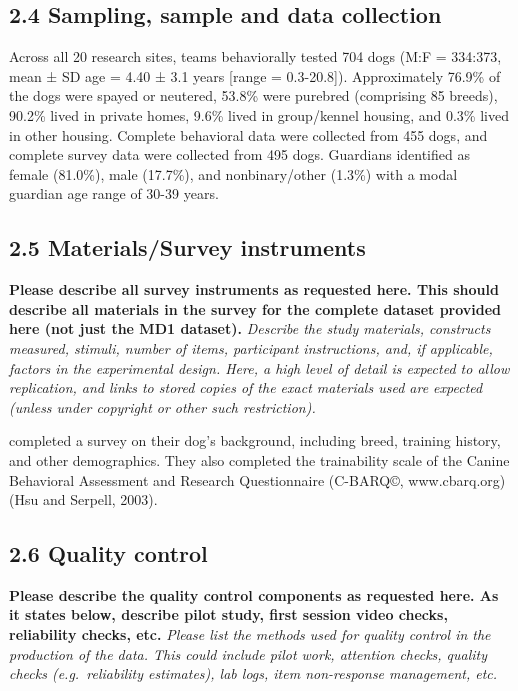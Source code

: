 \documentclass[
  pub,floatsintext]{apa6}
\begin{document}
\hypertarget{sampling-sample-and-data-collection}{%
\subsection{2.4 Sampling, sample and data collection}\label{sampling-sample-and-data-collection}}

Across all 20 research sites, teams behaviorally tested 704 dogs (M:F = 334:373, mean ± SD age = 4.40 ± 3.1 years {[}range = 0.3-20.8{]}). Approximately 76.9\% of the dogs were spayed or neutered, 53.8\% were purebred (comprising 85 breeds), 90.2\% lived in private homes, 9.6\% lived in group/kennel housing, and 0.3\% lived in other housing. Complete behavioral data were collected from 455 dogs, and complete survey data were collected from 495 dogs. Guardians identified as female (81.0\%), male (17.7\%), and nonbinary/other (1.3\%) with a modal guardian age range of 30-39 years.

\hypertarget{materialssurvey-instruments}{%
\subsection{2.5 Materials/Survey instruments}\label{materialssurvey-instruments}}

\textbf{Please describe all survey instruments as requested here. This should describe all materials in the survey for the complete dataset provided here (not just the MD1 dataset).}
\emph{Describe the study materials, constructs measured, stimuli, number of items, participant instructions, and, if applicable, factors in the experimental design. Here, a high level of detail is expected to allow replication, and links to stored copies of the exact materials used are expected (unless under copyright or other such restriction).}

completed a survey on their dog's background, including breed, training history, and other demographics. They also completed the trainability scale of the Canine Behavioral Assessment and Research Questionnaire (C-BARQ©, www.cbarq.org)(Hsu and Serpell, 2003).

\hypertarget{quality-control}{%
\subsection{2.6 Quality control}\label{quality-control}}

\textbf{Please describe the quality control components as requested here. As it states below, describe pilot study, first session video checks, reliability checks, etc.}
\emph{Please list the methods used for quality control in the production of the data. This could include pilot work, attention checks, quality checks (e.g.~reliability estimates), lab logs, item non-response management, etc.}
\end{document}
